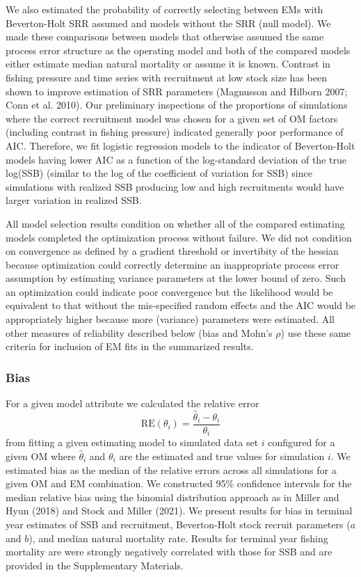 \documentclass[
  12pt,
]{article}
\begin{document}
We also estimated the probability of correctly selecting between EMs
with Beverton-Holt SRR assumed and models without the SRR (null model).
We made these comparisons between models that otherwise assumed the same
process error structure as the operating model and both of the compared
models either estimate median natural mortality or assume it is known.
Contrast in fishing pressure and time series with recruitment at low
stock size has been shown to improve estimation of SRR parameters
(Magnusson and Hilborn 2007; Conn et al. 2010). Our preliminary
inspections of the proportions of simulations where the correct
recruitment model was chosen for a given set of OM factors (including
contrast in fishing pressure) indicated generally poor performance of
AIC. Therefore, we fit logistic regression models to the indicator of
Beverton-Holt models having lower AIC as a function of the log-standard
deviation of the true log(SSB) (similar to the log of the coefficient of
variation for SSB) since simulations with realized SSB producing low and
high recruitments would have larger variation in realized SSB.

All model selection results condition on whether all of the compared
estimating models completed the optimization process without failure. We
did not condition on convergence as defined by a gradient threshold or
invertibity of the hessian because optimization could correctly
determine an inappropriate process error assumption by estimating
variance parameters at the lower bound of zero. Such an optimization
could indicate poor convergence but the likelihood would be equivalent
to that without the mis-specified random effects and the AIC would be
appropriately higher because more (variance) parameters were estimated.
All other measures of reliability described below (bias and Mohn's
\(\rho\)) use these same criteria for inclusion of EM fits in the
summarized results.

\hypertarget{bias}{%
\subsubsection*{Bias}\label{bias}}

For a given model attribute we calculated the relative error \[
\text{RE}\left(\theta_i\right) = \frac{\widehat \theta_i - \theta_i}{\theta_i}
\] from fitting a given estimating model to simulated data set \(i\)
configured for a given OM where \(\widehat \theta_i\) and \(\theta_i\)
are the estimated and true values for simulation \(i\). We estimated
bias as the median of the relative errors across all simulations for a
given OM and EM combination. We constructed 95\% confidence intervals
for the median relative bias using the binomial distribution approach as
in Miller and Hyun (2018) and Stock and Miller (2021). We present
results for bias in terminal year estimates of SSB and recruitment,
Beverton-Holt stock recruit parameters (\(a\) and \(b\)), and median
natural mortality rate. Results for terminal year fishing mortality are
were strongly negatively correlated with those for SSB and are provided
in the Supplementary Materials.
\end{document}
